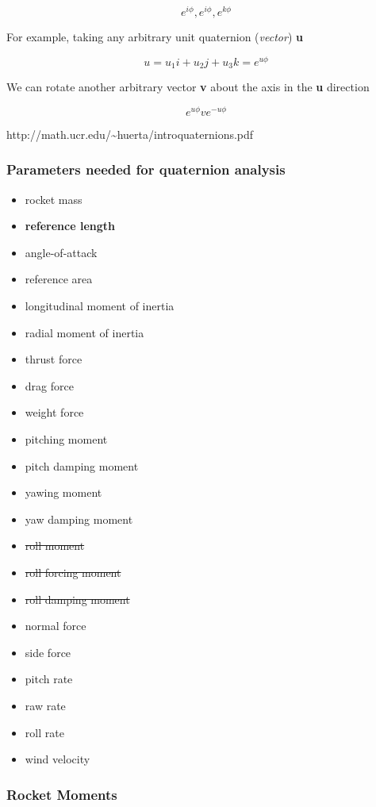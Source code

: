 \documentclass[]{article}
\providecommand{\tightlist}{%
  \setlength{\itemsep}{0pt}\setlength{\parskip}{0pt}}
\begin{document}
\[
e^{i\phi}, e^{i\phi}, e^{k\phi}
\]

For example, taking any arbitrary unit quaternion (\emph{vector})
\textbf{u}

\[
u = u_1i + u_2j + u_3k = e^{u\phi}
\]

We can rotate another arbitrary vector \textbf{v} about the axis in the
\textbf{u} direction

\[
e^{u\phi}ve^{-u\phi}
\]

http://math.ucr.edu/\textasciitilde{}huerta/introquaternions.pdf

\subsubsection{Parameters needed for quaternion
analysis}\label{parameters-needed-for-quaternion-analysis}

\begin{itemize}
\tightlist
\item
  rocket mass
\item
  \textbf{reference length}
\item
  angle-of-attack
\item
  reference area
\item
  longitudinal moment of inertia
\item
  radial moment of inertia
\item
  thrust force
\item
  drag force
\item
  weight force
\item
  pitching moment
\item
  pitch damping moment
\item
  yawing moment
\item
  yaw damping moment
\item
  \sout{roll moment}
\item
  \sout{roll forcing moment}
\item
  \sout{roll damping moment}
\item
  normal force
\item
  side force
\item
  pitch rate
\item
  raw rate
\item
  roll rate
\item
  wind velocity
\end{itemize}

\subsubsection{Rocket Moments}\label{rocket-moments}
\end{document}
